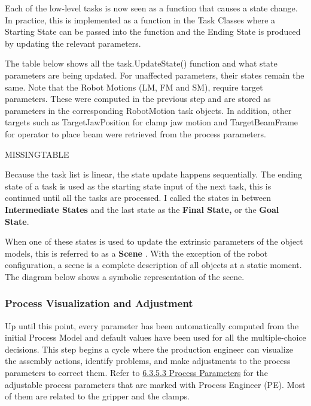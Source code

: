 Each of the low-level tasks is now seen as a function that causes a state change. In practice, this is implemented as a function in the Task Classes where a Starting State can be passed into the function and the Ending State is produced by updating the relevant parameters.



The table below shows all the task.UpdateState() function and what state parameters are being updated. For unaffected parameters, their states remain the same. Note that the Robot Motions (LM, FM and SM), require target parameters. These were computed in the previous step and are stored as parameters in the corresponding RobotMotion task objects. In addition, other targets such as TargetJawPosition for clamp jaw motion and TargetBeamFrame for operator to place beam were retrieved from the process parameters.

MISSINGTABLE

Because the task list is linear, the state update happens sequentially. The ending state of a task is used as the starting state input of the next task, this is continued until all the tasks are processed. I called the states in between \textbf{Intermediate States }and the last state as the \textbf{Final State, }or the \textbf{Goal State}.



When one of these states is used to update the extrinsic parameters of the object models, this is referred to as a \textbf{Scene} \parencite{moveit!PlanningSceneROS2023}. With the exception of the robot configuration, a scene is a complete description of all objects at a static moment. The diagram below shows a symbolic representation of the scene.




\subsubsection{Process Visualization and Adjustment}
\label{subsubsection:exploration_3_process_visualization_and_adjustment}




Up until this point, every parameter has been automatically computed from the initial Process Model and default values have been used for all the multiple-choice decisions. This step begins a cycle where the production engineer can visualize the assembly actions, identify problems, and make adjustments to the process parameters to correct them. Refer to \ul{6.3.5.3 Process Parameters} for the adjustable process parameters that are marked with Process Engineer (PE). Most of them are related to the gripper and the clamps. 

